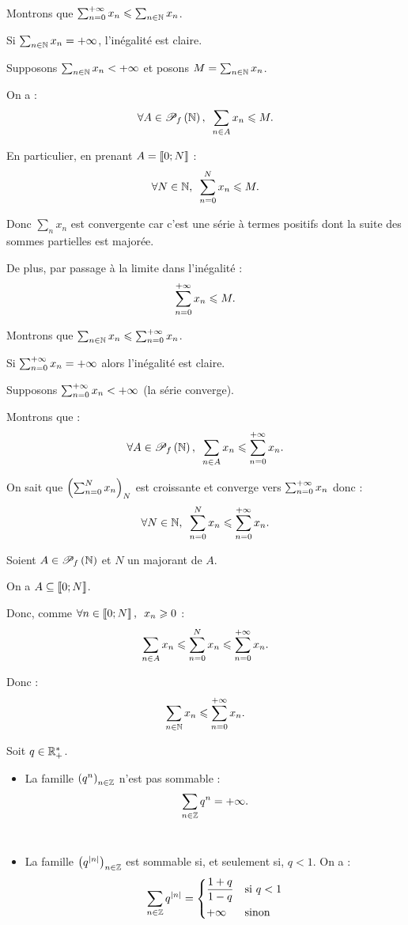 \begin{dem}~\\
\geqbox Montrons que \(\sum_{n=0}^{+\infty}x_n\leqslant\sum_{n\in\mathbb{N}}x_n\).

Si \(\sum_{n\in\mathbb{N}}x_n=+\infty\), l'inégalité est claire.

Supposons \(\sum_{n\in\mathbb{N}}x_n<+\infty\) et posons \(M=\sum_{n\in\mathbb{N}}x_n\).

On a : \[\quantifs{\forall A\in\Pf{\N}}\sum_{n\in A}x_n\leq M.\]

En particulier, en prenant \(A=\left\llbracket0;N\right\rrbracket\) : \[\quantifs{\forall N\in\N}\sum_{n=0}^Nx_n\leq M.\]

Donc \(\sum_nx_n\) est convergente car c'est une série à termes positifs dont la suite des sommes partielles est majorée.

De plus, par passage à la limite dans l'inégalité : \[\sum_{n=0}^{+\infty}x_n\leqslant M.\]

\leqbox Montrons que \(\sum_{n\in\mathbb{N}}x_n\leqslant\sum_{n=0}^{+\infty}x_n\).

Si \(\sum_{n=0}^{+\infty}x_n=+\infty\) alors l'inégalité est claire.

Supposons \(\sum_{n=0}^{+\infty}x_n<+\infty\) (\cad la série converge).

Montrons que : \[\quantifs{\forall A\in\Pf{\N}}\sum_{n\in A}x_n\leq\sum_{n=0}^{\pinf}x_n.\]

On sait que \(\left(\sum_{n=0}^Nx_n\right)_N\) est croissante et converge vers \(\sum_{n=0}^{+\infty}x_n\) donc : \[\quantifs{\forall N\in\N}\sum_{n=0}^Nx_n\leq\sum_{n=0}^{\pinf}x_n.\]

Soient \(A\in\mathscr{P}_f\left(\mathbb{N}\right)\) et \(N\) un majorant de \(A\).

On a \(A\subseteq\left\llbracket0;N\right\rrbracket\).

Donc, comme \(\quantifs{\forall n\in\interventierii{0}{N}}x_n\geq0\) : \[\sum_{n\in A}x_n\leqslant\sum_{n=0}^Nx_n\leqslant\sum_{n=0}^{+\infty}x_n.\]

Donc : \[\sum_{n\in\mathbb{N}}x_n\leqslant\sum_{n=0}^{+\infty}x_n.\]
\end{dem}

\begin{ex}
Soit \(q\in\mathbb{R}_+^*\).

\begin{itemize}
    \item La famille \(\left(q^n\right)_{n\in\mathbb{Z}}\) n'est pas sommable : \[\sum_{n\in\mathbb{Z}}q^n=+\infty.\]~
    \item La famille \(\left(q^{\left\lvert n\right\rvert}\right)_{n\in\mathbb{Z}}\) est sommable si, et seulement si, \(q<1\). On a : \[\sum_{n\in\mathbb{Z}}q^{\left\lvert n\right\rvert}=\begin{dcases}
        \dfrac{1+q}{1-q} &\text{si }q<1 \\
        +\infty &\text{sinon}
    \end{dcases}\]
\end{itemize}
\end{ex}

